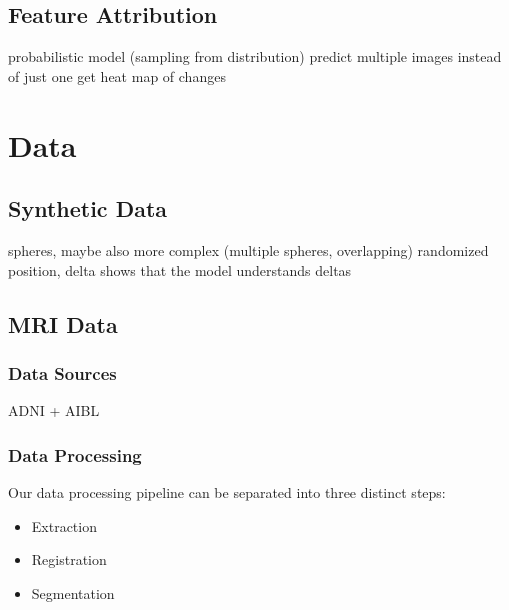 \section{Feature Attribution}
probabilistic model (sampling from distribution)
predict multiple images instead of just one
get heat map of changes

\chapter{Data}

\section{Synthetic Data}
spheres, maybe also more complex (multiple spheres, overlapping)
randomized position, delta
shows that the model understands deltas

\section{MRI Data}


\subsection{Data Sources}
ADNI + AIBL

\subsection{Data Processing}
Our data processing pipeline can be separated into three distinct steps:

\begin{itemize}
\item Extraction
\item Registration
\item Segmentation
\end{itemize}

